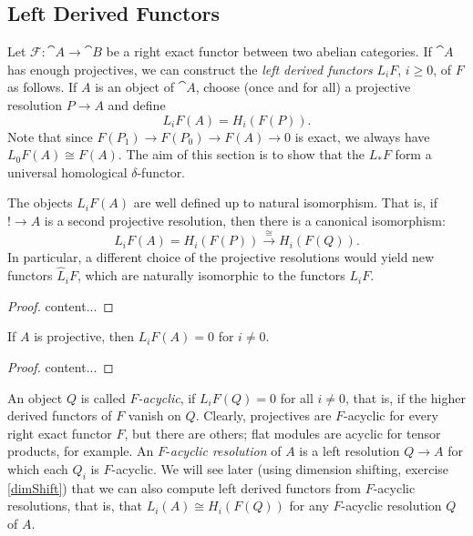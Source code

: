 \subsection{Left Derived Functors}

\begin{construction}
	Let $\mathcal{F}:\cat{A}\rightarrow\cat{B}$ be a right exact functor between two abelian categories.
	If $\cat{A}$ has enough projectives, we can construct the \textit{left derived functors} $L_iF$, $i\geq0$, of $F$ as follows.
	If $A$ is an object of $\cat{A}$, choose (once and for all) a projective resolution $P\rightarrow A$ and define
	$$L_iF(A)=H_i(F(P)).$$
	Note that since $F(P_1)\rightarrow F(P_0) \rightarrow F(A) \rightarrow 0$ is exact, we always have $L_0F(A)\cong F(A)$.
	The aim of this section is to show that the $L_*F$ form a universal homological $\delta$-functor.
\end{construction}

\begin{lemma}
	The objects $L_iF(A)$ are well defined up to natural isomorphism.
	That is, if $!\rightarrow A$ is a second projective resolution, then there is a canonical isomorphism:
	$$L_iF(A)=H_i(F(P))\overset{\cong}{\rightarrow} H_i(F(Q)).$$
	In particular, a different choice of the projective resolutions would yield new functors $\hat{L}_iF$, which are naturally isomorphic to the functors $L_iF$.
\end{lemma}

\begin{proof}
	content...
\end{proof}

\begin{corollary}
	If $A$ is projective, then $L_iF(A)=0$ for $i\neq 0$.
\end{corollary}

\begin{proof}
	content...
\end{proof}

\begin{definition}\label{acycOb}
	An object $Q$ is called $F$\textit{-acyclic}, if $L_iF(Q)=0$ for all $i\neq0$, that is, if the higher derived functors of $F$ vanish on $Q$.
	Clearly, projectives are $F$-acyclic for every right exact functor $F$, but there are others; flat modules are acyclic for tensor products, for example.
	An $F$-\textit{acyclic resolution} of $A$ is a left resolution $Q\rightarrow A$ for which each $Q_i$ is $F$-acyclic.
	We will see later (using dimension shifting, exercise \ref{dimShift}) that we can also compute left derived functors from $F$-acyclic resolutions, that is, that $L_i(A) \cong H_i(F(Q))$ for any $F$-acyclic resolution $Q$ of $A$.
\end{definition}

